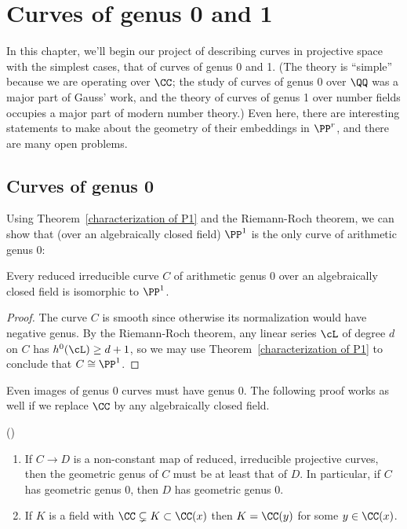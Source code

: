 

\chapter{Curves of genus 0 and 1}\label{genus 0 and 1 chapter}

In this chapter, we'll begin our project of describing curves in projective space with the simplest cases, that of curves of genus 0 and 1. (The theory is ``simple'' because we are operating over $\CC$; the study of curves of genus 0 over $\QQ$ was a major part of Gauss' work, and the theory of curves of genus 1 over number fields occupies a major part of modern number theory.) Even here, there are interesting statements to make about the geometry of their embeddings in $\PP^r$, and there are many open problems.
 

\section{Curves of genus 0} 

Using Theorem~\ref{characterization of P1} and the Riemann-Roch theorem, we can show that (over an algebraically closed field) $\PP^1$
is the only curve of arithmetic genus 0:

\begin{corollary}
 Every reduced irreducible curve $C$ of arithmetic genus 0 over an algebraically closed field is isomorphic to $\PP^1$.
 \end{corollary}

\begin{proof}
The curve $C$ is smooth since otherwise its normalization would have negative genus.
By the Riemann-Roch theorem, any linear series $\cL$ of degree $d$ on $C$ has $h^0(\cL) \geq d+1$, so we may use Theorem~\ref{characterization of P1}
to conclude that $C\cong \PP^1$.
\end{proof}

Even images of genus 0 curves must have genus 0. The following proof works as well if we replace $\CC$ by any algebraically
closed field.

\begin{theorem}(\cite{Luroth})\label{Lueroth}
\begin{enumerate}
\item If $C\to D$ is a non-constant map of reduced, irreducible projective curves, then the geometric genus of $C$ must be at least that of $D$.
In particular, if $C$ has geometric genus 0,  
then $D$ has geometric genus 0.
 \item If $K$ is a field with $\CC \subsetneq K \subset \CC(x)$
  then $K = \CC(y)$ for some $y \in \CC(x)$. 
\end{enumerate}
\end{theorem}



